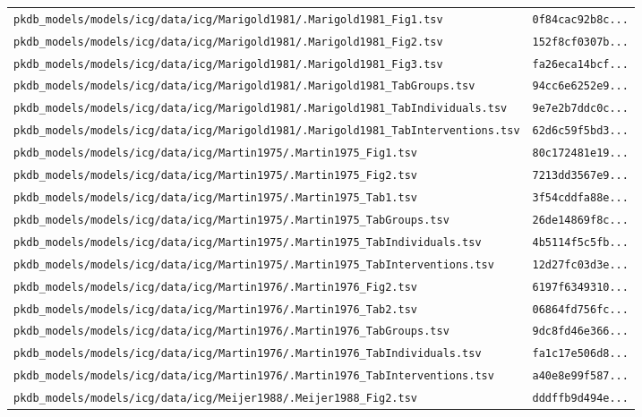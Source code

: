 \documentclass{article}
\begin{document}
\begin{longtable}{ll}
\texttt{pkdb\_models/models/icg/data/icg/Marigold1981/.Marigold1981\_Fig1.tsv} & \texttt{0f84cac92b8c...} \\
\texttt{pkdb\_models/models/icg/data/icg/Marigold1981/.Marigold1981\_Fig2.tsv} & \texttt{152f8cf0307b...} \\
\texttt{pkdb\_models/models/icg/data/icg/Marigold1981/.Marigold1981\_Fig3.tsv} & \texttt{fa26eca14bcf...} \\
\texttt{pkdb\_models/models/icg/data/icg/Marigold1981/.Marigold1981\_TabGroups.tsv} & \texttt{94cc6e6252e9...} \\
\texttt{pkdb\_models/models/icg/data/icg/Marigold1981/.Marigold1981\_TabIndividuals.tsv} & \texttt{9e7e2b7ddc0c...} \\
\texttt{pkdb\_models/models/icg/data/icg/Marigold1981/.Marigold1981\_TabInterventions.tsv} & \texttt{62d6c59f5bd3...} \\
\texttt{pkdb\_models/models/icg/data/icg/Martin1975/.Martin1975\_Fig1.tsv} & \texttt{80c172481e19...} \\
\texttt{pkdb\_models/models/icg/data/icg/Martin1975/.Martin1975\_Fig2.tsv} & \texttt{7213dd3567e9...} \\
\texttt{pkdb\_models/models/icg/data/icg/Martin1975/.Martin1975\_Tab1.tsv} & \texttt{3f54cddfa88e...} \\
\texttt{pkdb\_models/models/icg/data/icg/Martin1975/.Martin1975\_TabGroups.tsv} & \texttt{26de14869f8c...} \\
\texttt{pkdb\_models/models/icg/data/icg/Martin1975/.Martin1975\_TabIndividuals.tsv} & \texttt{4b5114f5c5fb...} \\
\texttt{pkdb\_models/models/icg/data/icg/Martin1975/.Martin1975\_TabInterventions.tsv} & \texttt{12d27fc03d3e...} \\
\texttt{pkdb\_models/models/icg/data/icg/Martin1976/.Martin1976\_Fig2.tsv} & \texttt{6197f6349310...} \\
\texttt{pkdb\_models/models/icg/data/icg/Martin1976/.Martin1976\_Tab2.tsv} & \texttt{06864fd756fc...} \\
\texttt{pkdb\_models/models/icg/data/icg/Martin1976/.Martin1976\_TabGroups.tsv} & \texttt{9dc8fd46e366...} \\
\texttt{pkdb\_models/models/icg/data/icg/Martin1976/.Martin1976\_TabIndividuals.tsv} & \texttt{fa1c17e506d8...} \\
\texttt{pkdb\_models/models/icg/data/icg/Martin1976/.Martin1976\_TabInterventions.tsv} & \texttt{a40e8e99f587...} \\
\texttt{pkdb\_models/models/icg/data/icg/Meijer1988/.Meijer1988\_Fig2.tsv} & \texttt{dddffb9d494e...} \\

\end{longtable}
\end{document}
